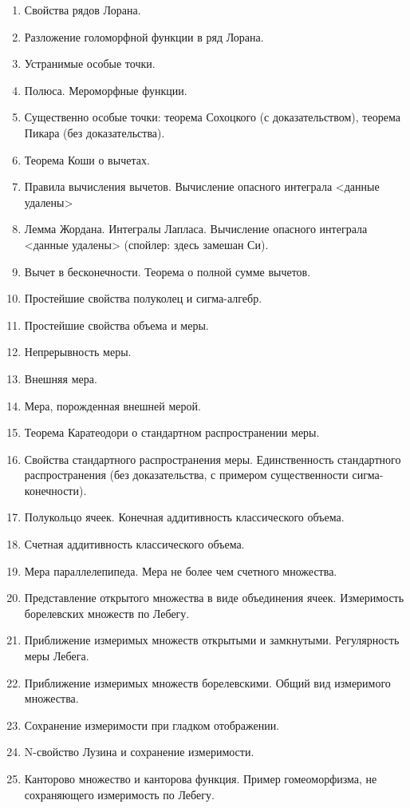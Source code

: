 \documentclass[12pt, a4paper]{book}
\begin{document}
\begin{enumerate}
\item Свойства рядов Лорана.
\item Разложение голоморфной функции в ряд Лорана.
\item Устранимые особые точки.
\item Полюса. Мероморфные функции.
\item Существенно особые точки: теорема Сохоцкого (с доказательством), теорема Пикара (без доказательства).
\item Теорема Коши о вычетах.
\item Правила вычисления вычетов. Вычисление опасного интеграла <данные удалены>
\item Лемма Жордана. Интегралы Лапласа. Вычисление опасного интеграла <данные удалены> (спойлер: здесь замешан Си).
\item Вычет в бесконечности. Теорема о полной сумме вычетов.
\item Простейшие свойства полуколец и сигма-алгебр.
\item Простейшие свойства объема и меры.
\item Непрерывность меры.
\item Внешняя мера.
\item Мера, порожденная внешней мерой.
\item Теорема Каратеодори о стандартном распространении меры.
\item Свойства стандартного распространения меры. Единственность стандартного распространения (без доказательства, с примером существенности сигма-конечности).
\item Полукольцо ячеек. Конечная аддитивность классического объема.
\item Счетная аддитивность классического объема.
\item Мера параллелепипеда. Мера не более чем счетного множества.
\item Представление открытого множества в виде объединения ячеек. Измеримость борелевских множеств по Лебегу.
\item Приближение измеримых множеств открытыми и замкнутыми. Регулярность меры Лебега.
\item Приближение измеримых множеств борелевскими. Общий вид измеримого множества.
\item Сохранение измеримости при гладком отображении.
\item N-свойство Лузина и сохранение измеримости.
\item Канторово множество и канторова функция. Пример гомеоморфизма, не сохраняющего измеримость по Лебегу.

\end{enumerate}
\end{document}
